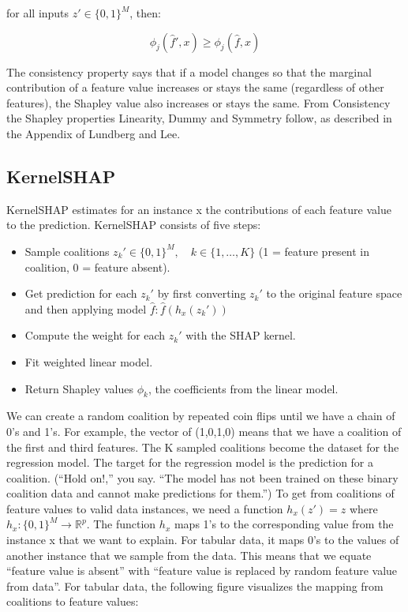 \documentclass[
  11pt,
]{scrbook}
\providecommand{\tightlist}{%
  \setlength{\itemsep}{0pt}\setlength{\parskip}{0pt}}
\begin{document}
for all inputs \(z'\in\{0,1\}^M\), then:

\[\phi_j(\hat{f}',x)\geq\phi_j(\hat{f},x)\]

The consistency property says that if a model changes so that the marginal contribution of a feature value increases or stays the same (regardless of other features), the Shapley value also increases or stays the same.
From Consistency the Shapley properties Linearity, Dummy and Symmetry follow, as described in the Appendix of Lundberg and Lee.

\hypertarget{kernelshap}{%
\subsection{KernelSHAP}\label{kernelshap}}

KernelSHAP estimates for an instance x the contributions of each feature value to the prediction.
KernelSHAP consists of five steps:

\begin{itemize}
\tightlist
\item
  Sample coalitions \(z_k'\in\{0,1\}^M,\quad{}k\in\{1,\ldots,K\}\) (1 = feature present in coalition, 0 = feature absent).
\item
  Get prediction for each \(z_k'\) by first converting \(z_k'\) to the original feature space and then applying model \(\hat{f}: \hat{f}(h_x(z_k'))\)
\item
  Compute the weight for each \(z_k'\) with the SHAP kernel.
\item
  Fit weighted linear model.
\item
  Return Shapley values \(\phi_k\), the coefficients from the linear model.
\end{itemize}

We can create a random coalition by repeated coin flips until we have a chain of 0's and 1's.
For example, the vector of (1,0,1,0) means that we have a coalition of the first and third features.
The K sampled coalitions become the dataset for the regression model.
The target for the regression model is the prediction for a coalition.
(``Hold on!,'' you say. ``The model has not been trained on these binary coalition data and cannot make predictions for them.'')
To get from coalitions of feature values to valid data instances, we need a function \(h_x(z')=z\) where \(h_x:\{0,1\}^M\rightarrow\mathbb{R}^p\).
The function \(h_x\) maps 1's to the corresponding value from the instance x that we want to explain.
For tabular data, it maps 0's to the values of another instance that we sample from the data.
This means that we equate ``feature value is absent'' with ``feature value is replaced by random feature value from data''.
For tabular data, the following figure visualizes the mapping from coalitions to feature values:
\end{document}

